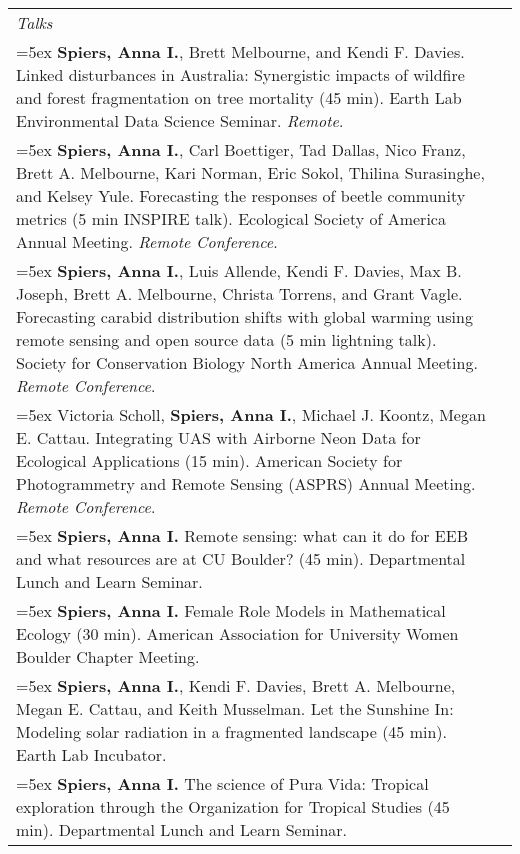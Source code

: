 \begin{longtable}{@{}>{\raggedright}p{5.25in} @{} >{\raggedleft}X@{}}

\emph{Talks}  \tabularnewline

\hangindent=5ex \textbf{Spiers, Anna I.}, Brett Melbourne, and Kendi F. Davies. Linked disturbances in Australia: Synergistic impacts of wildfire and forest fragmentation on tree mortality (45 min). Earth Lab Environmental Data Science Seminar. \emph{Remote}. &  2022 \tabularnewline %

\hangindent=5ex \textbf{Spiers, Anna I.}, Carl Boettiger, Tad Dallas, Nico Franz, Brett A. Melbourne, Kari Norman, Eric Sokol, Thilina Surasinghe, and Kelsey Yule. Forecasting the responses of beetle community metrics (5 min INSPIRE talk). Ecological Society of America Annual Meeting. \emph{Remote Conference}. &  2021 \tabularnewline %

\hangindent=5ex \textbf{Spiers, Anna I.}, Luis Allende, Kendi F. Davies, Max B. Joseph, Brett A. Melbourne, Christa Torrens, and Grant Vagle. Forecasting carabid distribution shifts with global warming using remote sensing and open source data (5 min lightning talk). Society for Conservation Biology North America Annual Meeting. \emph{Remote Conference}. &  2020 \tabularnewline %

\hangindent=5ex Victoria Scholl, \textbf{Spiers, Anna I.}, Michael J. Koontz, Megan E. Cattau. Integrating UAS with Airborne Neon Data for Ecological Applications (15 min).  American Society for Photogrammetry and Remote Sensing (ASPRS) Annual Meeting. \emph{Remote Conference}. &  2020 \tabularnewline %

\hangindent=5ex \textbf{Spiers, Anna I.} Remote sensing: what can it do for EEB and what resources are at CU Boulder? (45 min). Departmental Lunch and Learn Seminar. &  2019 \tabularnewline %

\hangindent=5ex \textbf{Spiers, Anna I.} Female Role Models in Mathematical Ecology (30 min). American Association for University Women Boulder Chapter Meeting. &  2019 \tabularnewline %

\hangindent=5ex \textbf{Spiers, Anna I.}, Kendi F. Davies, Brett A. Melbourne, Megan E. Cattau, and Keith Musselman. Let the Sunshine In: Modeling solar radiation in a fragmented landscape (45 min). Earth Lab Incubator. &  2019 \tabularnewline %

\hangindent=5ex \textbf{Spiers, Anna I.} The science of Pura Vida: Tropical exploration through the Organization for Tropical Studies (45 min). Departmental Lunch and Learn Seminar. &  2019 \tabularnewline %


\end{longtable}
